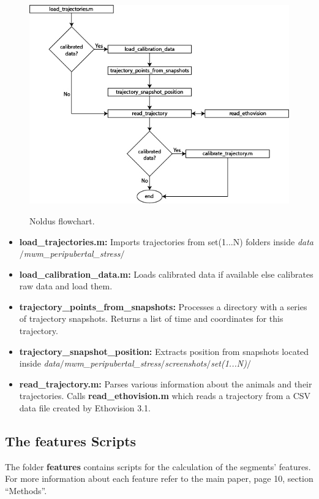 \documentclass[12pt,titlepage]{article}
\begin{document}
\begin{doublespace}
\begin{figure}[H]
	\begin{center}
		\includegraphics[width=1\textwidth]{noldus.jpg}\\
		\caption [noldus]{Noldus flowchart.}\label{noldus}
	\end{center}
\end{figure}

\begin{itemize}
	\item\textbf{load\_trajectories.m:}
	 Imports trajectories from set(1...N) folders inside \textit{data$/$mwm\_peripubertal\_stress$/$}
	\item\textbf{load\_calibration\_data.m:}
	 Loads calibrated data if available else calibrates raw data and load them.
	\item\textbf{trajectory\_points\_from\_snapshots:}
	 Processes a directory with a series of trajectory snapshots. Returns a list of time and coordinates for this trajectory.
	\item\textbf{trajectory\_snapshot\_position:}
	 Extracts position from snapshots located inside  \textit{data$/$mwm\_peripubertal\_stress$/$screenshots$/$set(1...N)$/$}
	\item\textbf{read\_trajectory.m:}
	 Parses various information about the animals and their trajectories. Calls \textbf{read\_ethovision.m} which reads a trajectory from a CSV data file created by Ethovision 3.1.
\end{itemize}

\subsection{The features Scripts}
The folder \textbf{features} contains scripts for the calculation of the segments' features. For more information about each feature refer to the main paper, page 10, section ``Methods''.


\end{doublespace}
\end{document}
